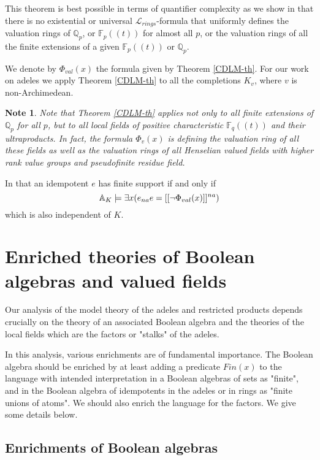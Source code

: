 \documentclass[12pt]{amsart}
\def\F{\mathbb{F}}
\def\cL{\mathcal{L}}
\def\Q{\mathbb{Q}}
\def\F{\mathbb{F}}
\def\cL{\mathcal{L}}
\numberwithin{equation}{section}
\newtheorem{note}{Note}[section]
\begin{document}
This theorem is best possible in terms of quantifier complexity as we show in \cite{CDLM} that there is no existential or universal $\cL_{rings}$-formula that uniformly defines the valuation rings of $\Q_p$, or $\F_p((t))$ for almost all $p$, or the valuation rings of 
all the finite extensions of a given $\F_p((t))$ or $\Q_p$. 

We denote by $\Phi_{val}(x)$ the formula given by Theorem \ref{CDLM-th}. For our work on adeles we apply Theorem \ref{CDLM-th} to all the completions $K_v$, where $v$ is non-Archimedean.
\begin{note} Note that Theorem \ref{CDLM-th} applies not only to all finite extensions of $\Q_p$ for all $p$, but to all 
local fields of positive characteristic $\F_q((t))$ and their ultraproducts. In fact, the formula $\Phi_v(x)$ is defining the valuation ring of all these fields as well as the valuation rings of all Henselian valued fields with higher rank value groups and pseudofinite residue field. 
\end{note}

In \cite{DM-ad} that an idempotent $e$ has finite support if and only if 
$$\Bbb A_K\models\exists x (e_{na}e=[[\neg\Phi_{val}(x)]]^{na})$$ 
which is also independent of $K$.



\section{\bf Enriched theories of Boolean algebras and valued fields}\label{sec-bool}

Our analysis of the model theory of the adeles and restricted products depends crucially on the 
theory of an associated Boolean algebra and the theories of the local fields which are the factors or "stalks" of the adeles. 

In this analysis, various enrichments are of fundamental importance. The Boolean algebra should be enriched by at least adding a predicate $Fin(x)$ to the language 
with intended interpretation in a Boolean algebras of sets as "finite", and in the Boolean algebra of idempotents in the adeles or in rings 
as "finite unions of atoms". We should also enrich the language for the factors. We give some details below.

\medskip

\subsection{\bf Enrichments of Boolean algebras}\label{ssec-benrich} 
\end{document}
